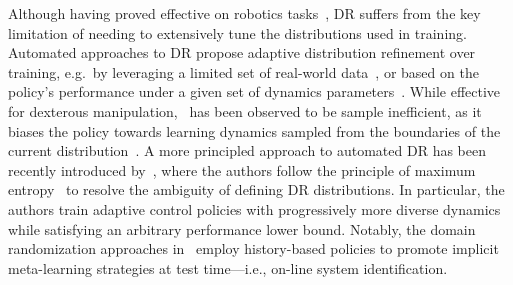 Although having proved effective on robotics tasks~\citep{antonova2017reinforcement}, DR suffers from the key limitation of needing to extensively tune the distributions used in training. Automated approaches to DR propose adaptive distribution refinement over training, e.g.~by leveraging a limited set of real-world data~\citep{tiboniadrbenchmark,tiboni2023dropo}, or based on the policy's performance under a given set of dynamics parameters~\citep{akkaya2019solving}. While effective for dexterous manipulation,~\citet{akkaya2019solving} has been observed to be sample inefficient, as it biases the policy towards learning dynamics sampled from the boundaries of the current distribution~\citep{tiboni2023domain}. A more principled approach to automated DR has been recently introduced by~\citet{tiboni2023domain}, where the authors follow the principle of maximum entropy~\citep{jaynes1957information} to resolve the ambiguity of defining DR distributions. In particular, the authors train adaptive control policies with progressively more diverse dynamics while satisfying an arbitrary performance lower bound.
Notably, the domain randomization approaches in~\citet{akkaya2019solving,tiboni2023domain} employ history-based policies to promote implicit meta-learning strategies at test time---i.e., on-line system identification.
